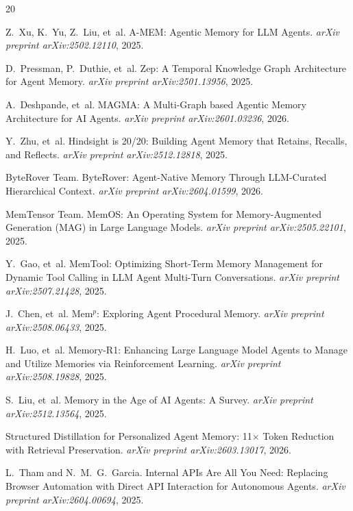 \documentclass[11pt,twocolumn]{article}
\begin{document}
\begin{thebibliography}{20}

Z.~Xu, K.~Yu, Z.~Liu, et~al.
\newblock A-MEM: Agentic Memory for LLM Agents.
\newblock \emph{arXiv preprint arXiv:2502.12110}, 2025.

D.~Pressman, P.~Duthie, et~al.
\newblock Zep: A Temporal Knowledge Graph Architecture for Agent Memory.
\newblock \emph{arXiv preprint arXiv:2501.13956}, 2025.

A.~Deshpande, et~al.
\newblock MAGMA: A Multi-Graph based Agentic Memory Architecture for AI Agents.
\newblock \emph{arXiv preprint arXiv:2601.03236}, 2026.

Y.~Zhu, et~al.
\newblock Hindsight is 20/20: Building Agent Memory that Retains, Recalls, and Reflects.
\newblock \emph{arXiv preprint arXiv:2512.12818}, 2025.

ByteRover Team.
\newblock ByteRover: Agent-Native Memory Through LLM-Curated Hierarchical Context.
\newblock \emph{arXiv preprint arXiv:2604.01599}, 2026.

MemTensor Team.
\newblock MemOS: An Operating System for Memory-Augmented Generation (MAG) in Large Language Models.
\newblock \emph{arXiv preprint arXiv:2505.22101}, 2025.

Y.~Gao, et~al.
\newblock MemTool: Optimizing Short-Term Memory Management for Dynamic Tool Calling in LLM Agent Multi-Turn Conversations.
\newblock \emph{arXiv preprint arXiv:2507.21428}, 2025.

J.~Chen, et~al.
\newblock Mem$^p$: Exploring Agent Procedural Memory.
\newblock \emph{arXiv preprint arXiv:2508.06433}, 2025.

H.~Luo, et~al.
\newblock Memory-R1: Enhancing Large Language Model Agents to Manage and Utilize Memories via Reinforcement Learning.
\newblock \emph{arXiv preprint arXiv:2508.19828}, 2025.

S.~Liu, et~al.
\newblock Memory in the Age of AI Agents: A Survey.
\newblock \emph{arXiv preprint arXiv:2512.13564}, 2025.

Structured Distillation for Personalized Agent Memory: 11$\times$ Token Reduction with Retrieval Preservation.
\newblock \emph{arXiv preprint arXiv:2603.13017}, 2026.

L.~Tham and N.~M.~G.~Garcia.
\newblock Internal APIs Are All You Need: Replacing Browser Automation with Direct API Interaction for Autonomous Agents.
\newblock \emph{arXiv preprint arXiv:2604.00694}, 2025.

\end{thebibliography}
\end{document}
